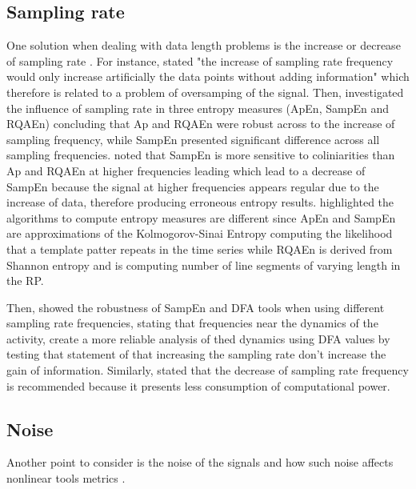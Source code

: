 \subsection{Sampling rate}
One solution when dealing with data length problems is the increase 
or decrease of sampling rate \cite{caballero2014}.
For instance, \cite{duarte2008} stated "the increase of sampling rate 
frequency would only increase artificially the data points without 
adding information" which therefore is related to a problem of oversamping
of the signal. %
Then, \cite{rhea2011} investigated the influence of sampling rate
 in three entropy measures (ApEn, SampEn and RQAEn) concluding that
Ap and RQAEn were robust across to the increase of sampling frequency,
while SampEn presented significant difference across all sampling 
frequencies. \cite{rhea2011}  noted that SampEn is more sensitive to 
coliniarities than Ap and RQAEn at higher frequencies leading which lead to a decrease 
of SampEn because the signal at higher frequencies appears regular due 
to the increase of data, therefore producing erroneous entropy results.
\cite{rhea2011} highlighted the algorithms to compute entropy measures
are different since ApEn and SampEn are approximations
of the Kolmogorov-Sinai Entropy 
computing the likelihood that a template patter repeats in the time series
while RQAEn is derived from Shannon entropy and is computing
number of line segments of varying length in the RP.

Then, \cite{caballero2013} showed the robustness of SampEn and DFA tools
when using different sampling rate frequencies, stating that 
frequencies near the dynamics of the activity, 
create a more reliable analysis of thed dynamics using DFA values
by testing that statement of \cite{duarte2008} that 
increasing the sampling rate don't increase the gain of information.
Similarly, \cite{caballero2013} stated that the decrease of sampling 
rate frequency is recommended because it presents less consumption 
of computational power.






\subsection{Noise}
Another point to consider is the noise of the signals
and how such noise affects nonlinear tools metrics \cite{caballero2014}.

